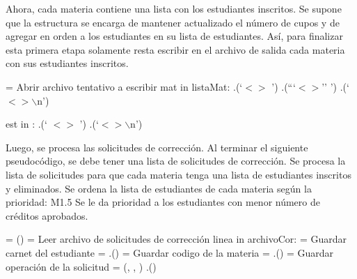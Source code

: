 \documentclass[11pt]{article}
\begin{document}
   Ahora, cada materia contiene una lista con los estudiantes inscritos. Se
   supone que la estructura se encarga de mantener actualizado el número de
   cupos y de agregar en orden a los estudiantes en su lista de estudiantes.
   Así, para finalizar esta primera etapa solamente resta escribir en el
   archivo de salida cada materia con sus estudiantes inscritos.

   \begin{codebox}
      \li {} = Abrir archivo tentativo a escribir
      \li \For mat in listaMat:
      \Do
         \li {}.(`$<$$>$ ')
         \li {}.(```$<$$>$'' ')
         \li {}.(`$<$$>\backslash$n')
         
         \li \For est in :
         \Do
            \li {}.(`   $<$$>$ ')
            \li {}.(`$<$$>\backslash$n') \label{li:Generar-Archivo-Tentativo-final}
            \End
         \End
         \End
      \End
   \end{codebox}

   Luego, se procesa las solicitudes de corrección. Al terminar el siguiente pseudocódigo, 
   se debe tener una lista de solicitudes de corrección. Se procesa la lista de solicitudes 
   para que cada materia tenga una lista de estudiantes inscritos y eliminados. Se ordena 
   la lista de estudiantes de cada materia según la prioridad: M1.5 Se le da prioridad a los 
   estudiantes con menor número de créditos aprobados. 

   \begin{codebox}
      \li
      \li {} =  ()
      \li {} = Leer archivo de solicitudes de corrección
      \li \For linea in archivoCor:
      \li \Do
          = Guardar carnet del estudiante
         \li {} = .()
         \li {} = Guardar codigo de la materia
         \li {} = .()
         \li {} = Guardar operación de la solicitud
         \li {} =  (, , )
         \li {}.() \label{li:Extraer-Datos-Correccion-final}
         \End
      \End
   \end{codebox}
\end{document}
